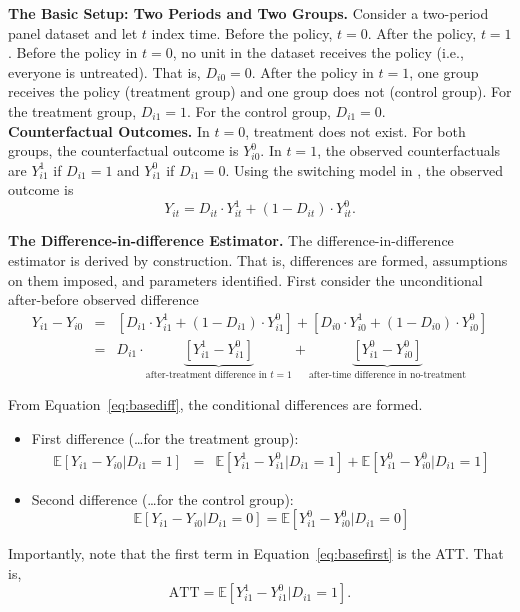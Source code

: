 \pagebreak
\noindent \textbf{The Basic Setup: Two Periods and Two Groups.} Consider a two-period panel dataset and let $t$ index time. Before the policy, $t = 0$. After the policy, $t = 1$. Before the policy in $t = 0$, no unit in the dataset receives the policy (i.e., everyone is untreated). That is, $D_{i0} = 0$. After the policy in $t = 1$, one group receives the policy (treatment group) and one group does not (control group). For the treatment group, $D_{i1} = 1$. For the control group, $D_{i1} = 0$. \\

\noindent \textbf{Counterfactual Outcomes.} In $t = 0$, treatment does not exist. For both groups, the counterfactual outcome is $Y_{i0}^0$. In $t = 1$, the observed counterfactuals are $Y_{i1}^1$ if $D_{i1} = 1$ and $Y_{i1}^0$ if $D_{i1} = 0$. Using the switching model in \citet{quandt_new_1972}, the observed outcome is\\
\begin{equation}
Y_{it} = D_{it} \cdot Y_{it}^1 +  \left( 1 - D_{it} \right) \cdot Y_{it}^0.
\end{equation}

\noindent \textbf{The Difference-in-difference Estimator.} The difference-in-difference estimator is derived by construction. That is, differences are formed, assumptions on them imposed, and parameters identified. First consider the unconditional after-before observed difference
\begin{eqnarray} 
Y_{i1} - Y_{i0} &=& \left[ D_{i1} \cdot Y_{i1}^1 +  \left( 1 - D_{i1} \right) \cdot Y_{i1}^0 \right] + \left[ D_{i0} \cdot Y_{i0}^1 +  \left( 1 - D_{i0} \right) \cdot Y_{i0}^0 \right] \nonumber \\ 
		      &=& D_{i1} \cdot \underbrace{\left[  Y_{i1}^1 -  Y_{i1}^0 \right]}_{\text{after-treatment difference in } t = 1}  + \underbrace{\left[  Y_{i1}^0 -  Y_{i0}^0 \right]}_{\text{after-time difference in no-treatment}} \label{eq:basediff}
\end{eqnarray}

\noindent From Equation~\eqref{eq:basediff}, the conditional differences are formed.
	\begin{itemize} 
		\item First difference (\ldots for the treatment group): 
			\begin{eqnarray}
				\mathbb{E} \left[ Y_{i1} - Y_{i0} | D_{i1} = 1 \right] &=& \mathbb{E} \left[  Y_{i1}^1 -  Y_{i1}^0 | D_{i1} = 1 \right]  + \mathbb{E}  \left[  Y_{i1}^0 -  Y_{i0}^0 | D_{i1} = 1\right] \label{eq:basefirst}
			\end{eqnarray}
		\item Second difference (\ldots for the control group):
			\begin{equation}
				\mathbb{E} \left[ Y_{i1} - Y_{i0} | D_{i1} = 0 \right] =  \mathbb{E}  \left[  Y_{i1}^0 -  Y_{i0}^0 | D_{i1} = 0 \right]
			\end{equation}
	\end{itemize}
\noindent Importantly, note that the first term in Equation~\eqref{eq:basefirst} is the ATT. That is, 
\begin{equation}
\text{ATT} = \mathbb{E} \left[  Y_{i1}^1 -  Y_{i1}^0 | D_{i1} = 1 \right]. 
\end{equation}

